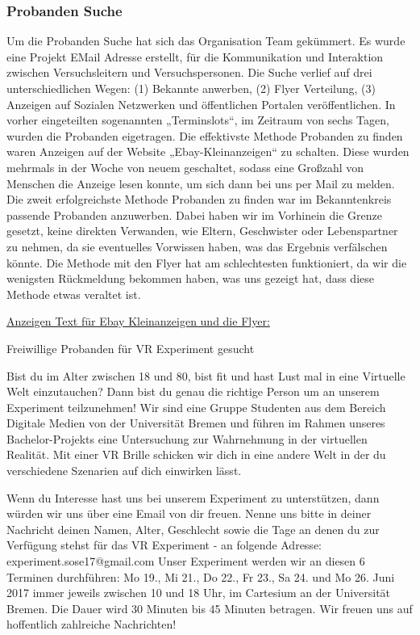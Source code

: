 \documentclass{Bericht}
\begin{document}
\subsubsection{Probanden Suche}
Um die Probanden Suche hat sich das Organisation Team gekümmert. Es wurde eine Projekt EMail
Adresse erstellt, für die Kommunikation und Interaktion zwischen Versuchsleitern und Versuchspersonen.
Die Suche verlief auf drei unterschiedlichen Wegen: (1) Bekannte anwerben,
(2) Flyer Verteilung, (3) Anzeigen auf Sozialen Netzwerken und öffentlichen Portalen veröffentlichen.
In vorher eingeteilten sogenannten „Terminslots“, im Zeitraum von sechs Tagen, wurden
die Probanden eigetragen. Die effektivste Methode Probanden zu finden waren Anzeigen auf
der Website „Ebay-Kleinanzeigen“ zu schalten. Diese wurden mehrmals in der Woche von neuem
geschaltet, sodass eine Großzahl von Menschen die Anzeige lesen konnte, um sich dann bei
uns per Mail zu melden.
Die zweit erfolgreichste Methode Probanden zu finden war im Bekanntenkreis passende Probanden
anzuwerben. Dabei haben wir im Vorhinein die Grenze gesetzt, keine direkten Verwanden,
wie Eltern, Geschwister oder Lebenspartner zu nehmen, da sie eventuelles Vorwissen haben,
was das Ergebnis verfälschen könnte.
Die Methode mit den Flyer hat am schlechtesten funktioniert, da wir die wenigsten Rückmeldung
bekommen haben, was uns gezeigt hat, dass diese Methode etwas veraltet ist.
\par
\underline{Anzeigen Text für Ebay Kleinanzeigen und die Flyer:}
\par
Freiwillige Probanden für VR Experiment gesucht
\par
Bist du im Alter zwischen 18 und 80, bist fit und hast Lust mal in eine Virtuelle Welt einzutauchen?
Dann bist du genau die richtige Person um an unserem Experiment teilzunehmen!
Wir sind eine Gruppe Studenten aus dem Bereich Digitale Medien von der Universität Bremen und
führen im Rahmen unseres Bachelor-Projekts eine Untersuchung zur Wahrnehmung in der virtuellen
Realität. Mit einer VR Brille schicken wir dich in eine andere Welt in der du verschiedene Szenarien
auf dich einwirken lässt.
\par
Wenn du Interesse hast uns bei unserem Experiment zu unterstützen, dann würden wir uns über
eine Email von dir freuen. Nenne uns bitte in deiner Nachricht deinen Namen, Alter, Geschlecht
sowie die Tage an denen du zur Verfügung stehst für das VR Experiment - an folgende Adresse:
experiment.sose17@gmail.com
Unser Experiment werden wir an diesen 6 Terminen durchführen:
Mo 19., Mi 21., Do 22., Fr 23., Sa 24. und Mo 26. Juni 2017 immer jeweils zwischen 10 und 18 Uhr,
im Cartesium an der Universität Bremen. Die Dauer wird 30 Minuten bis 45 Minuten betragen.
Wir freuen uns auf hoffentlich zahlreiche Nachrichten!
\end{document}
